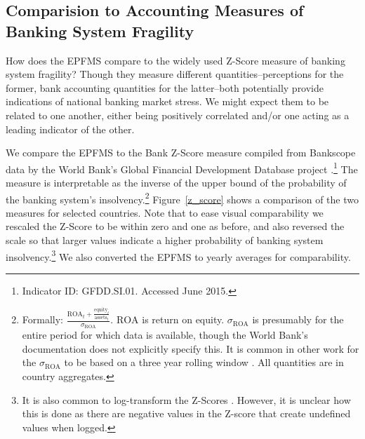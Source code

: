 \documentclass[]{article}
\begin{document}
\subsection{Comparision to Accounting Measures of Banking System Fragility}

How does the EPFMS compare to the widely used Z-Score measure of banking system fragility? Though they measure different quantities--perceptions for the former, bank accounting quantities for the latter--both potentially provide indications of national banking market stress. We might expect them to be related to one another, either being positively correlated and/or one acting as a leading indicator of the other.

We compare the EPFMS to the Bank Z-Score measure compiled from Bankscope data by the World Bank's Global Financial Development Database project \citep{worldbank2013}.\footnote{Indicator ID: GFDD.SI.01. Accessed June 2015.} The measure is interpretable as the inverse of the upper bound of the probability of the banking system's insolvency.\footnote{Formally: $\frac{\mathrm{ROA}_{t} + \frac{\mathrm{equity}_{t}}{\mathrm{assets}_{t}}}{\sigma_{\mathrm{ROA}}}$. $\mathrm{ROA}$ is return on equity. $\sigma_{\mathrm{ROA}}$ is presumably for the entire period for which data is available, though the World Bank's documentation does not explicitly specify this. It is common in other work for the $\sigma_{\mathrm{ROA}}$ to be based on a three year rolling window \cite[225]{beck2013bank}. All quantities are in country aggregates.} Figure~\ref{z_score} shows a comparison of the two measures for selected countries. Note that to ease visual comparability we rescaled the Z-Score to be within zero and one as before, and also reversed the scale so that larger values indicate a higher probability of banking system insolvency.\footnote{It is also common to log-transform the Z-Scores \cite[225]{beck2013bank}. However, it is unclear how this is done as there are negative values in the Z-score that create undefined values when logged.} We also converted the EPFMS to yearly averages for comparability.
\end{document}
